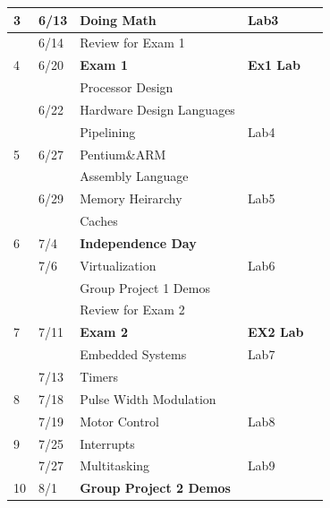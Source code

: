 \documentclass[a4paper]{article}
\newlength{\DUtablewidth} %
\begin{document}
\begin{longtable*}[c]{|p{0.086\DUtablewidth}|p{0.133\DUtablewidth}|p{0.307\DUtablewidth}|p{0.133\DUtablewidth}|p{0.133\DUtablewidth}|}
3
 & 
6/13
 & 
Doing Math
 & 
Lab3
 &  \\
\hline
 & 
6/14
 & 
Review for Exam 1
 &  &  \\
\hline

4
 & 
6/20
 & 
\textbf{Exam 1}
 & 
\textbf{Ex1 Lab}
 &  \\
\hline
 &  & 
Processor Design
 &  &  \\
\hline
 & 
6/22
 & 
Hardware Design Languages
 &  &  \\
\hline
 &  & 
Pipelining
 & 
Lab4
 &  \\
\hline

5
 & 
6/27
 & 
Pentium\&ARM
 &  &  \\
\hline
 &  & 
Assembly Language
 &  &  \\
\hline
 & 
6/29
 & 
Memory Heirarchy
 & 
Lab5
 &  \\
\hline
 &  & 
Caches
 &  &  \\
\hline

6
 & 
7/4
 & 
\textbf{Independence Day}
 &  &  \\
\hline
 & 
7/6
 & 
Virtualization
 & 
Lab6
 &  \\
\hline
 &  & 
Group Project 1 Demos
 &  &  \\
\hline
 &  & 
Review for Exam 2
 &  &  \\
\hline

7
 & 
7/11
 & 
\textbf{Exam 2}
 & 
\textbf{EX2 Lab}
 &  \\
\hline
 &  & 
Embedded Systems
 & 
Lab7
 &  \\
\hline
 & 
7/13
 & 
Timers
 &  &  \\
\hline

8
 & 
7/18
 & 
Pulse Width Modulation
 &  &  \\
\hline
 & 
7/19
 & 
Motor Control
 & 
Lab8
 &  \\
\hline

9
 & 
7/25
 & 
Interrupts
 &  &  \\
\hline
 & 
7/27
 & 
Multitasking
 & 
Lab9
 &  \\
\hline

10
 & 
8/1
 & 
\textbf{Group Project 2 Demos}
 &  &  \\
\hline
\end{longtable*}
\end{document}

